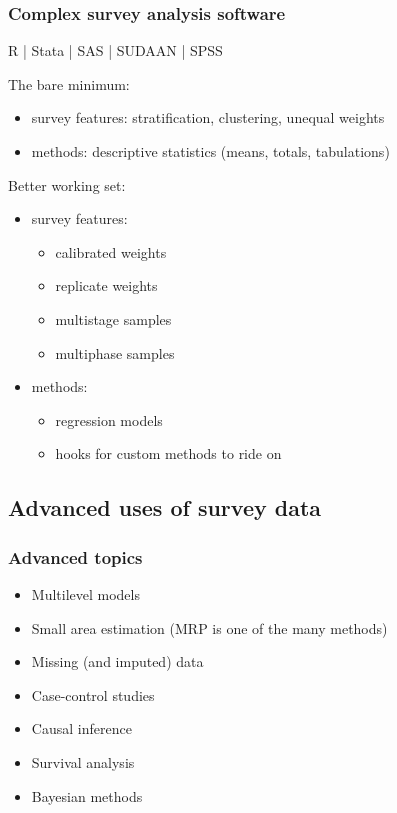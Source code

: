 \documentclass{beamer}
\begin{document}
\begin{frame}\frametitle{Complex survey analysis software}

R | Stata | SAS | SUDAAN | SPSS

\bigskip

The bare minimum:
\begin{itemize}
    \item survey features: stratification, clustering, unequal weights
    \item methods: descriptive statistics (means, totals, tabulations)
\end{itemize}

Better working set:
\begin{itemize}
    \item survey features:
    \begin{itemize}
        \item calibrated weights
        \item replicate weights
        \item multistage samples
        \item multiphase samples
    \end{itemize}
    \item methods:
    \begin{itemize}
        \item regression models
        \item hooks for custom methods to ride on
    \end{itemize}
\end{itemize}

\end{frame}



\subsection{Advanced uses of survey data}

\begin{frame}\frametitle{Advanced topics}

\begin{itemize}
    \item Multilevel models
    \item Small area estimation (MRP is one of the many methods)
    \item Missing (and imputed) data
    \item Case-control studies
    \item Causal inference
    \item Survival analysis
    \item Bayesian methods
\end{itemize}

\end{frame}
\end{document}
